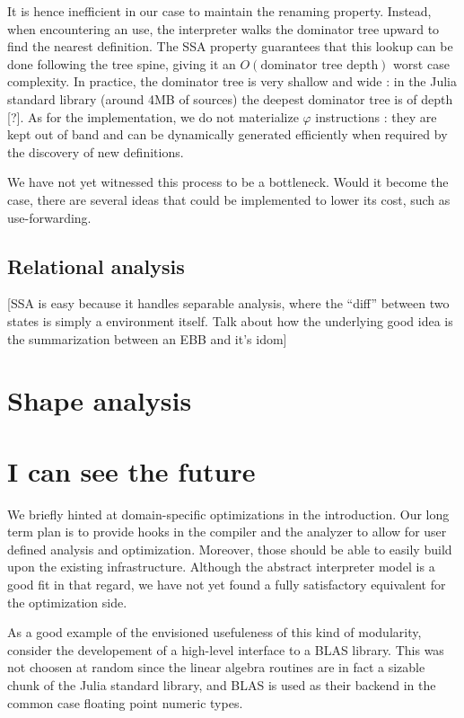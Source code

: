 \documentclass[11pt]{article}
\renewcommand{\phi}{\varphi}
\begin{document}
It is hence inefficient in our case to maintain the renaming property. Instead, when encountering an use, the interpreter walks the dominator tree upward to find the nearest definition. The SSA property guarantees that this lookup can be done following the tree spine, giving it an $O(\text{dominator tree depth})$ worst case complexity. In practice, the dominator tree is very shallow and wide : in the Julia standard library (around 4MB of sources) the deepest dominator tree is of depth [?]. As for the implementation, we do not materialize $\phi$ instructions : they are kept out of band and can be dynamically generated efficiently when required by the discovery of new definitions.

We have not yet witnessed this process to be a bottleneck. Would it become the case, there are several ideas that could be implemented to lower its cost, such as use-forwarding.

\subsection*{Relational analysis}

[SSA is easy because it handles separable analysis, where the ``diff'' between two states is simply a environment itself. Talk about how the underlying good idea is the summarization between an EBB and it's idom]

\section*{Shape analysis}

\section*{I can see the future}


We briefly hinted at domain-specific optimizations in the introduction.
Our long term plan is to provide hooks in the compiler and the analyzer to allow for user defined analysis and optimization.
Moreover, those should be able to easily build upon the existing infrastructure.
Although the abstract interpreter model is a good fit in that regard, we have not yet found a fully satisfactory equivalent for the optimization side.

As a good example of the envisioned usefuleness of this kind of modularity, consider the developement of a high-level interface to a BLAS library.
This was not choosen at random since the linear algebra routines are in fact a sizable chunk of the Julia standard library, and BLAS is used as their backend in the common case floating point numeric types.
\end{document}
